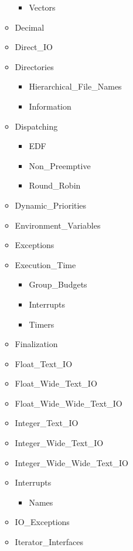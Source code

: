\documentclass[english]{article}
\begin{document}
\begin{scriptsize}
\begin{multicols*}{5}
\begin{itemize}[leftmargin=0mm]
\begin{itemize}[leftmargin=5mm]
\begin{itemize}[leftmargin=5mm]
            \item[] Vectors
         \end{itemize}
      \item[] Decimal
      \item[] Direct\_IO
      \item[] Directories
         \begin{itemize}[leftmargin=5mm]
            \item[] Hierarchical\_File\_Names
            \item[] Information
         \end{itemize}
      \item[] Dispatching
         \begin{itemize}[leftmargin=5mm]
            \item[] EDF
            \item[] Non\_Preemptive
            \item[] Round\_Robin
         \end{itemize}
      \item[] Dynamic\_Priorities
      \item[] Environment\_Variables
      \item[] Exceptions
      \item[] Execution\_Time
         \begin{itemize}[leftmargin=5mm]
            \item[] Group\_Budgets
            \item[] Interrupts
            \item[] Timers
         \end{itemize}
      \item[] Finalization
      \item[] Float\_Text\_IO
      \item[] Float\_Wide\_Text\_IO
      \item[] Float\_Wide\_Wide\_Text\_IO
      \item[] Integer\_Text\_IO
      \item[] Integer\_Wide\_Text\_IO
      \item[] Integer\_Wide\_Wide\_Text\_IO
      \item[] Interrupts
         \begin{itemize}[leftmargin=5mm]
            \item[] Names
         \end{itemize}
      \item[] IO\_Exceptions
      \item[] Iterator\_Interfaces

\end{itemize}
\end{itemize}
\end{multicols*}
\end{scriptsize}
\end{document}
